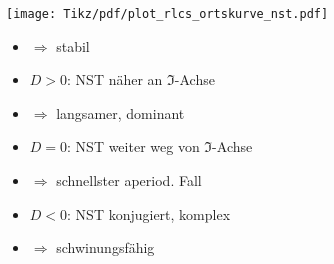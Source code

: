 \begin{frame}[t]
{\begin{minipage}{\textwidth}\centering
    \begin{minipage}{0.4\textwidth}\centering
        \texttt{[image: Tikz/pdf/plot\_rlcs\_ortskurve\_nst.pdf]}%
    \end{minipage}%
    \begin{minipage}{0.56\textwidth}\centering
        \begin{itemize}
            \item[]  $\Rightarrow$ stabil
            \item[] $D>0$: NST näher an $\Im$-Achse
            \item[] \hspace{2cm} $\Rightarrow$ langsamer, dominant
            \item[] $D=0$: NST weiter weg von $\Im$-Achse
            \item[] \hspace{2cm} $\Rightarrow$ schnellster aperiod. Fall
            \item[] $D<0$: NST konjugiert, komplex
            \item[] \hspace{2cm} $\Rightarrow$ schwinungsfähig
        \end{itemize}
    \end{minipage}
\end{minipage}
}%
\end{frame}

\newpage%
